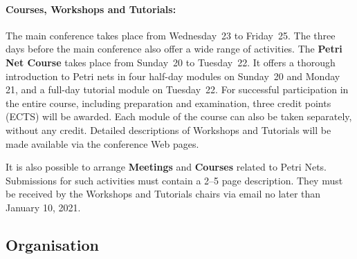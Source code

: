 \documentclass[10pt,a4paper]{article}
\begin{document}
\vspace*{-0.5em}
\paragraph*{Courses, Workshops and Tutorials:}\mbox{}

The main conference takes place from Wednesday~23 to Friday~25.
The three days before the main conference also offer a wide range of activities.
The {\bf Petri Net Course}
takes place from Sunday~20 to Tuesday~22.
It offers a thorough introduction to Petri nets in
four half-day modules on Sunday~20 and Monday 21, and a full-day tutorial module on Tuesday~22.
For successful participation in the entire course, including preparation and examination,
three credit points (ECTS) will be awarded. Each module of the course can also be
taken separately, without any credit.
Detailed descriptions of Workshops and Tutorials will be made available via the conference
Web pages.

It is also possible to arrange {\bf Meetings} and {\bf Courses} related to Petri Nets.
Submissions for such activities must contain a 2--5 page description. They must be
received by the Workshops and Tutorials chairs via email no later than January 10,
2021.

\subsection*{Organisation}
\end{document}
